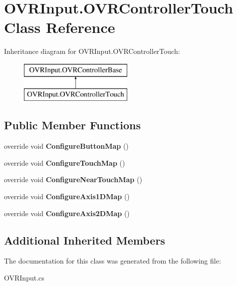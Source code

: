 \hypertarget{class_o_v_r_input_1_1_o_v_r_controller_touch}{}\section{O\+V\+R\+Input.\+O\+V\+R\+Controller\+Touch Class Reference}
\label{class_o_v_r_input_1_1_o_v_r_controller_touch}
Inheritance diagram for O\+V\+R\+Input.\+O\+V\+R\+Controller\+Touch\+:\begin{figure}[H]
\begin{center}
\leavevmode
\includegraphics[height=2.000000cm]{class_o_v_r_input_1_1_o_v_r_controller_touch}
\end{center}
\end{figure}
\subsection*{Public Member Functions}
\begin{DoxyCompactItemize}
\item 
\mbox{\label{class_o_v_r_input_1_1_o_v_r_controller_touch_a3dcbd1a0f9ccfbe7fceca2db362d6c46}} 
override void {\bfseries Configure\+Button\+Map} ()
\item 
\mbox{\label{class_o_v_r_input_1_1_o_v_r_controller_touch_afe90043139969c955ee00824ce0d8305}} 
override void {\bfseries Configure\+Touch\+Map} ()
\item 
\mbox{\label{class_o_v_r_input_1_1_o_v_r_controller_touch_aa10a889d1dffb2e62b60f9caecbe6028}} 
override void {\bfseries Configure\+Near\+Touch\+Map} ()
\item 
\mbox{\label{class_o_v_r_input_1_1_o_v_r_controller_touch_a40d17722a4f8dd17bd8c3cdb882de942}} 
override void {\bfseries Configure\+Axis1\+D\+Map} ()
\item 
\mbox{\label{class_o_v_r_input_1_1_o_v_r_controller_touch_a00a29106dbd06ac48450499195165a2d}} 
override void {\bfseries Configure\+Axis2\+D\+Map} ()
\end{DoxyCompactItemize}
\subsection*{Additional Inherited Members}


The documentation for this class was generated from the following file\+:\begin{DoxyCompactItemize}
\item 
O\+V\+R\+Input.\+cs\end{DoxyCompactItemize}
